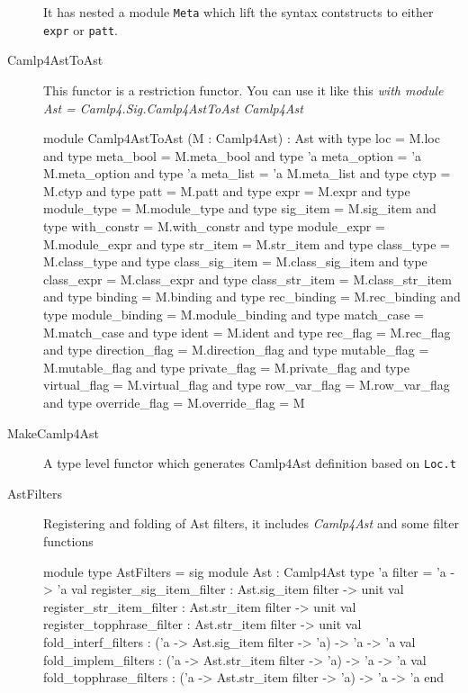 \begin{description}
  It has nested a module \verb|Meta| which lift the syntax contstructs
  to either \verb|expr| or \verb|patt|.
  
\item[Camlp4AstToAst]
  This  functor is a restriction functor. You can use it like this
  \textit{with module Ast = Camlp4.Sig.Camlp4AstToAst Camlp4Ast}

\begin{ocamlcode}
  module Camlp4AstToAst (M : Camlp4Ast) : Ast with type loc = M.loc
  and type meta_bool = M.meta_bool and type 'a meta_option = 'a M.meta_option
  and type 'a meta_list = 'a M.meta_list and type ctyp = M.ctyp
  and type patt = M.patt and type expr = M.expr
  and type module_type = M.module_type and type sig_item = M.sig_item
  and type with_constr = M.with_constr and type module_expr = M.module_expr
  and type str_item = M.str_item and type class_type = M.class_type
  and type class_sig_item = M.class_sig_item
  and type class_expr = M.class_expr
  and type class_str_item = M.class_str_item and type binding = M.binding
  and type rec_binding = M.rec_binding
  and type module_binding = M.module_binding
  and type match_case = M.match_case and type ident = M.ident
  and type rec_flag = M.rec_flag and type direction_flag = M.direction_flag
  and type mutable_flag = M.mutable_flag
  and type private_flag = M.private_flag
  and type virtual_flag = M.virtual_flag
  and type row_var_flag = M.row_var_flag
  and type override_flag = M.override_flag = M
\end{ocamlcode}

  
\item[MakeCamlp4Ast] A type level functor which generates Camlp4Ast
  definition based on \verb|Loc.t|

  
\item[AstFilters] Registering and folding of Ast filters, it includes
  \textit{Camlp4Ast} and some filter functions

\begin{ocamlcode}
  module type AstFilters =
  sig
    module Ast : Camlp4Ast
    type 'a filter = 'a -> 'a
    val register_sig_item_filter : Ast.sig_item filter -> unit
    val register_str_item_filter : Ast.str_item filter -> unit
    val register_topphrase_filter : Ast.str_item filter -> unit
    val fold_interf_filters : ('a -> Ast.sig_item filter -> 'a) -> 'a -> 'a
    val fold_implem_filters : ('a -> Ast.str_item filter -> 'a) -> 'a -> 'a
    val fold_topphrase_filters :
      ('a -> Ast.str_item filter -> 'a) -> 'a -> 'a
  end
\end{ocamlcode}


\end{description}
